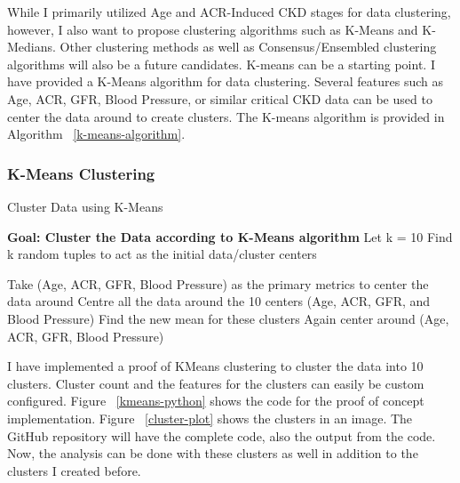 \flushleft \justifying While I primarily utilized Age and ACR-Induced CKD stages for data clustering, however, I also want to propose clustering algorithms such as K-Means and K-Medians. Other clustering methods as well as Consensus/Ensembled clustering algorithms will also be a future candidates. K-means can be a starting point. I have provided a K-Means algorithm for data clustering. Several features such as Age, ACR, GFR, Blood Pressure, or similar critical CKD data can be used to center the data around to create clusters. The K-means algorithm is provided in Algorithm ~\ref{k-means-algorithm}.

\subsubsection{K-Means Clustering}
\renewcommand{\labelitemi}{$$}

\begin{algorithm}
\caption{Cluster Data using K-Means}
\label{k-means-algorithm}
\begin{algorithmic}
\STATE \textbf{Goal: Cluster the Data according to K-Means algorithm}\vspace{0.10cm}
\STATE Let k = 10
\STATE Find k random tuples to act as the initial data/cluster centers
\vspace{0.10cm}

\STATE Take (Age, ACR, GFR, Blood Pressure) as the primary metrics to center the data around
\STATE Centre all the data around the 10 centers (Age, ACR, GFR, and Blood Pressure)
\STATE Find the new mean for these clusters
\STATE Again center around (Age, ACR, GFR, Blood Pressure)

\ENDWHILE

\vspace{0.10cm}
\end{algorithmic}
\end{algorithm}


\flushleft \justifying I have implemented a proof of KMeans clustering to cluster the data into 10 clusters. Cluster count and the features for the clusters can easily be custom configured. Figure ~\ref{kmeans-python} shows the code for the proof of concept implementation. Figure ~\ref{cluster-plot} shows the clusters in an image. The GitHub repository will have the complete code, also the output from the code. Now, the analysis can be done with these clusters as well in addition to the clusters I created before.

